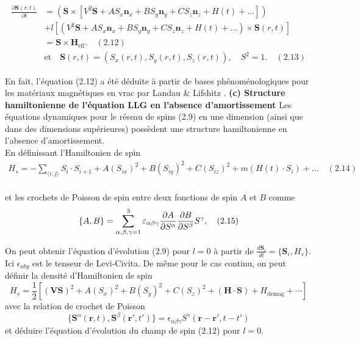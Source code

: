 \documentclass{article}
\begin{document}
\begin{align}
	\frac{\partial \mathbf{S}(r, t)}{\partial t} &= \left( \mathbf{S} \times \left[ V^2\mathbf{S} + AS_x \mathbf{n}_x + BS_y \mathbf{n}_y + CS_z \mathbf{n}_z + H(t) + \ldots \right] \right) \nonumber \\
	&+ l \left[ \left( V^2\mathbf{S} + AS_x \mathbf{n}_x + BS_y \mathbf{n}_y + CS_z \mathbf{n}_z + H(t) + \ldots \right) \times \mathbf{S}(r, t) \right] \nonumber \\
	&= \mathbf{S} \times \mathbf{H}_{\text{eff}}. \quad (2.12) \nonumber \\
	&\text{et} \quad \mathbf{S}(r, t) = (S_x(r, t), S_y(r, t), S_z(r, t)), \quad S^2 = 1. \quad (2.13) \nonumber
	\end{align}
	
	En fait, l'équation (2.12) a été déduite à partir de bases phénoménologiques pour les matériaux magnétiques en vrac par Landau \& Lifshitz \cite{landau}.
	\textbf{(c) Structure hamiltonienne de l'équation LLG en l'absence d'amortissement}
	Les équations dynamiques pour le réseau de spins (2.9) en une dimension (ainsi que dans des dimensions supérieures) possèdent une structure hamiltonienne en l'absence d'amortissement. \\
	En définissant l'Hamiltonien de spin \newline
	\begin{align*}
	H_s = - \sum_{\langle i,j \rangle} S_i \cdot S_{i+1} + A(S_{ix})^2 + B(S_{iy})^2 + C(S_{iz})^2 + m(H(t) \cdot S_i) + \ldots \quad (2.14) 
	\end{align*} \\
	et les crochets de Poisson de spin entre deux fonctions de spin $A$ et $B$ comme
	\newline \newline
	\begin{align*}
	\centering
	\{A, B\} = \sum_{\alpha,\beta,\gamma=1}^3 \varepsilon_{\alpha\beta\gamma} \frac{\partial A}{\partial S^{\alpha}} \frac{\partial B}{\partial S^{\beta}} S^{\gamma}, \quad (2.15)
	\end{align*}
	
	On peut obtenir l'équation d'évolution (2.9) pour $l = 0$ à partir de $\frac{d\mathbf{S}_i}{dt} = \{\mathbf{S}_i, H_s\}$. Ici $\epsilon_{abg}$ est le tenseur de Levi-Civita. De même pour le cas continu, on peut définir la densité d'Hamiltonien de spin
	\[
	H_s = \frac{1}{2} \left[(\mathbf{VS})^2 + A(S_x)^2 + B(S_y)^2 + C(S_z)^2 + (\mathbf{H} \cdot \mathbf{S}) + H_{\text{demag}} + \cdots \right] \tag{2.16}
	\]
	avec la relation de crochet de Poisson
	\[
	\{\mathbf{S}^{\alpha}(\mathbf{r}, t), \mathbf{S}^{\beta}(\mathbf{r}', t')\} = \epsilon_{\alpha\beta\gamma} S^{\gamma}(\mathbf{r} - \mathbf{r}', t - t') \tag{2.17}
	\]
	et déduire l'équation d'évolution du champ de spin (2.12) pour $l = 0$.
	
\end{document}
